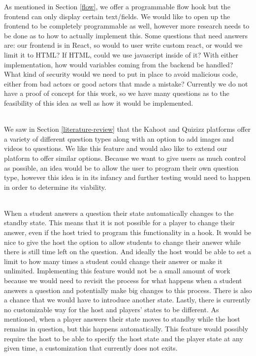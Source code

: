 \documentclass{article}
\begin{document}
    As mentioned in Section \ref{flow}, we offer a programmable flow hook but the frontend can only display certain text/fields. We would like to open up the frontend to be completely programmable as well, however more research needs to be done as to how to actually implement this. Some questions that need answers are: our frontend is in React, so would to user write custom react, or would we limit it to HTML? If HTML, could we use javascript inside of it? With either implementation, how would variables coming from the backend be handled? What kind of security would we need to put in place to avoid malicious code, either from bad actors or good actors that made a mistake? Currently we do not have a proof of concept for this work, so we have many questions as to the feasibility of this idea as well as how it would be implemented.
    \\\\
    \smallskip
    
    We saw in Section \ref{literature-review} that the Kahoot and Quizizz platforms offer a variety of different question types along with an option to add images and videos to questions. We like this feature and would also like to extend our platform to offer similar options. Because we want to give users as much control as possible, an idea would be to allow the user to program their own question type, however this idea is in its infancy and further testing would need to happen in order to determine its viability.
    \\\\
    \smallskip
    
    When a student answers a question their state automatically changes to the standby state. This means that it is not possible for a player to change their answer, even if the host tried to program this functionality in a hook. It would be nice to give the host the option to allow students to change their answer while there is still time left on the question. And ideally the host would be able to set a limit to how many times a student could change their answer or make it unlimited. Implementing this feature would not be a small amount of work because we would need to revisit the process for what happens when a student answers a question and potentially make big changes to this process. There is also a chance that we would have to introduce another state. Lastly, there is currently no customizable way for the host and players' states to be different. As mentioned, when a player answers their state moves to standby while the host remains in question, but this happens automatically. This feature would possibly require the host to be able to specify the host state and the player state at any given time, a customization that currently does not exits.
    \\\\
    \smallskip
    
\end{document}
